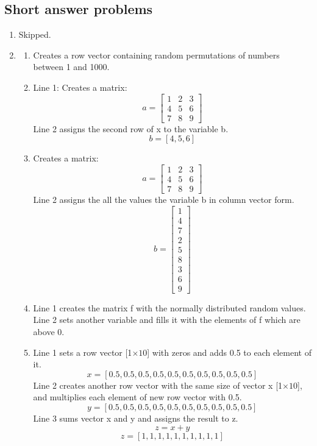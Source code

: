 \documentclass[man]{apa6}
\begin{document}
\subsection{Short answer problems}
	\begin{enumerate}
		\item Skipped.
		
		\item 
			\begin{enumerate}
				\item Creates a row vector containing random permutations of numbers between 1 and 1000.
				
				\item Line 1: Creates a matrix: \\
					\[ a= \left[ \begin{array}{ccc}
					1 & 2 & 3 \\
					4 & 5 & 6 \\
					7 & 8 & 9 \end{array} \right]\] 
					Line 2 assigns the second row of x to the variable b.
					$$ b = [4,5,6]$$

				\item Creates a matrix: \\
					\[ a= \left[ \begin{array}{ccc}
					1 & 2 & 3 \\
					4 & 5 & 6 \\
					7 & 8 & 9 \end{array} \right]\] 
					Line 2 assigns the all the values the variable b in column vector form.
					\[ b= \left[ \begin{array}{c}
					1 \\ 4 \\ 7 \\
					2 \\ 5 \\ 8 \\
					3 \\ 6 \\ 9 \end{array} \right]\] 

				\item Line 1 creates the matrix f with the normally distributed random values. \\
					Line 2 sets another variable and fills it with the elements of f which are above 0.

				\item Line 1 sets a row vector  [1$\times10$] with zeros and adds 0.5 to each element of it.
					$$x= [0.5,0.5,0.5,0.5,0.5,0.5,0.5,0.5,0.5,0.5]$$
					Line 2 creates another row vector with the same size of vector x [1$\times10$], and multiplies each element of new row vector with 0.5. \\
					$$y= [0.5,0.5,0.5,0.5,0.5,0.5,0.5,0.5,0.5,0.5]$$
					Line 3 sums vector x and y and assigns the result to z.
					$$z = x + y$$
					$$z= [1,1,1,1,1,1,1,1,1,1]$$
					

\end{enumerate}
\end{enumerate}
\end{document}
